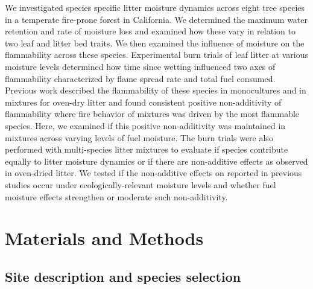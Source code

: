 \documentclass[letterpaper,12pt]{article}
\begin{document}
We investigated species specific litter moisture dynamics across eight tree
species in a temperate fire-prone forest in California. We determined the
maximum water retention and rate of moisture loss and examined how these vary
in relation to two leaf and litter bed traits. We then examined the influence
of moisture on the flammability across these species. Experimental burn trials
of leaf litter at various moisture levels determined how time since wetting
influenced two axes of flammability characterized by flame spread rate and
total fuel consumed. Previous work described the flammability of these species
in monocultures and in mixtures for oven-dry litter
\citep{Magalhaes+Schwilk-2012} and found consistent positive non-additivity of
flammability where fire behavior of mixtures was driven by the most flammable
species. Here, we examined if this positive non-additivity was maintained in
mixtures across varying levels of fuel moisture. The burn trials were also
performed with multi-species litter mixtures to evaluate if species contribute
equally to litter moisture dynamics or if there are non-additive effects as
observed in oven-dried litter. We tested if the non-additive effects on
reported in previous studies occur under ecologically-relevant moisture levels
and whether fuel moisture effects strengthen or moderate such non-additivity.


\section*{Materials and Methods}

\subsection*{Site description and species selection}
\end{document}
